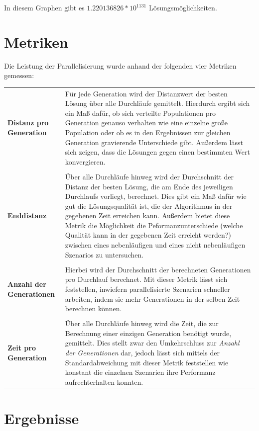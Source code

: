 \documentclass[12pt,a4paper]{scrreprt}
\begin{document}
In diesem Graphen gibt es $1.220136826 * 10^{1131}$ Lösungsmöglichkeiten.

\section{Metriken}
\label{sec:metriken}

Die Leistung der Parallelisierung wurde anhand der folgenden vier Metriken gemessen:

\begin{longtable}{p{4.5cm} p{8.5cm}}
\textbf{Distanz pro Generation} & Für jede Generation wird der Distanzwert der besten Lösung über alle Durchläufe gemittelt. Hierdurch ergibt sich ein Maß dafür, ob sich verteilte Populationen pro Generation genauso verhalten wie eine einzelne große Population oder ob es in den Ergebnissen zur gleichen Generation gravierende Unterschiede gibt. Außerdem lässt sich zeigen, dass die Lösungen gegen einen bestimmten Wert konvergieren.\\
 & \\
\textbf{Enddistanz} & Über alle Durchläufe hinweg wird der Durchschnitt der Distanz der besten Lösung, die am Ende des jeweiligen Durchlaufs vorliegt, berechnet. Dies gibt ein Maß dafür wie gut die Lösungsqualität ist, die der Algorithmus in der gegebenen Zeit erreichen kann. Außerdem bietet diese Metrik die Möglichkeit die Peformanzunterschiede (welche Qualität kann in der gegebenen Zeit erreicht werden?) zwischen eines nebenläufigen und eines nicht nebenläufigen Szenarios zu untersuchen.\\
 & \\
\textbf{Anzahl der Generationen} & Hierbei wird der Durchschnitt der berechneten Generationen pro Durchlauf berechnet. Mit dieser Metrik lässt sich feststellen, inwiefern parallelisierte Szenarien schneller arbeiten, indem sie mehr Generationen in der selben Zeit berechnen können. \\
 & \\
\textbf{Zeit pro Generation} & Über alle Durchläufe hinweg wird die Zeit, die zur Berechnung einer einzigen Generation benötigt wurde, gemittelt. Dies stellt zwar den Umkehrschluss zur \textit{Anzahl der Generationen} dar, jedoch lässt sich mittels der Standardabweichung mit dieser Metrik feststellen wie konstant die einzelnen Szenarien ihre Performanz aufrechterhalten konnten.
\end{longtable}

\section{Ergebnisse}
\label{sec:ergebnisse}
\end{document}
